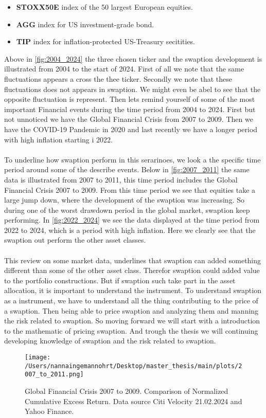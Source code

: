 \begin{itemize}
    \item \textbf{STOXX50E} \text{---}  index of the 50 largest European equities.
    \item \textbf{AGG} \text{---}  index for US investment-grade bond. 
    \item \textbf{TIP} \text{---}  index for inflation-protected US-Treasury secitities.
    \end{itemize}
\noindent
Above in \autoref{fig:2004_2024} the three chosen ticker and the swaption development
is illustrated from 2004 to the start of 2024.
First of all we note that the same fluctuations appears a cross the thee ticker. 
Secondly we note that these fluctuations does not appears in swaption. 
We might even be abel to see that the opposite fluctuation is represent. 
Then lets remind yourself of some of the most important Financial events during 
the time period from 2004 to 2024. First but not unnoticed we have the Global Financial Crisis
from 2007 to 2009.  Then we have the COVID-19 Pandemic in 2020 and last recently we have a 
longer period with high inflation starting i 2022. 
\\\\
To underline how swaption perform in this serarinoes, we look a the specific time period
around some of the describe events. Below in \autoref{fig:2007_2011} the same data is illustrated
from 2007 to 2011, this time period includes the Global Financial Crisis 2007 to 2009. 
From this time period we see that equities take a large jump down, where the development of the 
swaption was increasing. So during one of the worst drawdown period in the global market, 
swaption keep performing. In \autoref{fig:2022_2024} we see the data displayed at the 
time period from 2022 to 2024, which is a period with high inflation. 
Here we clearly see that the swaption out perform the other asset classes. 
\\\\
This review on some market data, underlines that swaption can added something different than some 
of the other asset class. Therefor swaption could added value to the portfolio constructions. 
But if swaption such take part in the asset allocation, it is important to understand the instrument.
To understand swaption as a instrument, we have to understand all the thing contributing to the price
of a swaption. Then being able to price swaption and analyzing them and manning the risk related to 
swaption.  So moving forward we will start with a introduction to the mathematic of pricing swaption. 
And trough the thesis we will continuing  developing knowledge of swaption and the risk related to swaption.
\begin{figure}[H]
    \centering
    \texttt{[image: /Users/nannaingemannohrt/Desktop/master\_thesis/main/plots/2007\_to\_2011.png]}
    \caption{Global Financial Crisis 2007 to 2009.  Comparison of Normalized Cumulative Excess Return. Data source Citi Velocity 21.02.2024 
    and Yahoo Finance.}
    \label{fig:2007_2011}
\end{figure}
\noindent

